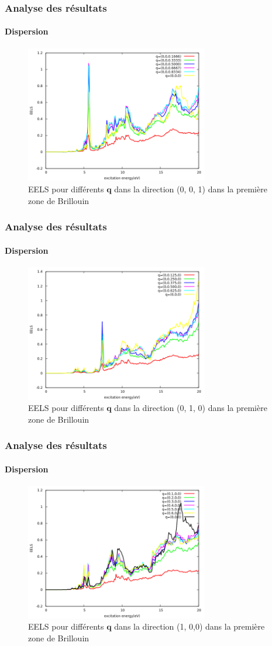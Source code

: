 \documentclass[french]{beamer}
\newcommand{\vb}[1]{\mathbf{#1}}
\begin{document}
\begin{frame}
\frametitle{Analyse des résultats}
\framesubtitle{Dispersion}
\begin{figure}[!h]
    \centering
    \includegraphics[width=8cm]{q6}
    \caption{EELS pour différents $\vb{q}$ dans la direction (0, 0, 1) dans la première zone de Brillouin}\label{fig-q6}
\end{figure}

\end{frame}
\begin{frame}
\frametitle{Analyse des résultats}
\framesubtitle{Dispersion}
\begin{figure}[!h]
    \centering
    \includegraphics[width=8cm]{q8}
        \caption{EELS pour différents $\vb{q}$ dans la direction (0, 1, 0) dans la première zone de Brillouin}\label{fig-q8}
\end{figure}

\end{frame}
\begin{frame}
\frametitle{Analyse des résultats}
\framesubtitle{Dispersion}
\begin{figure}[!h]
    \centering
    \includegraphics[width=8cm]{q10}
    \caption{EELS pour différents $\vb{q}$ dans la direction (1, 0,0) dans la première zone de Brillouin}\label{fig-q10}
\end{figure}
\end{frame}
\end{document}
